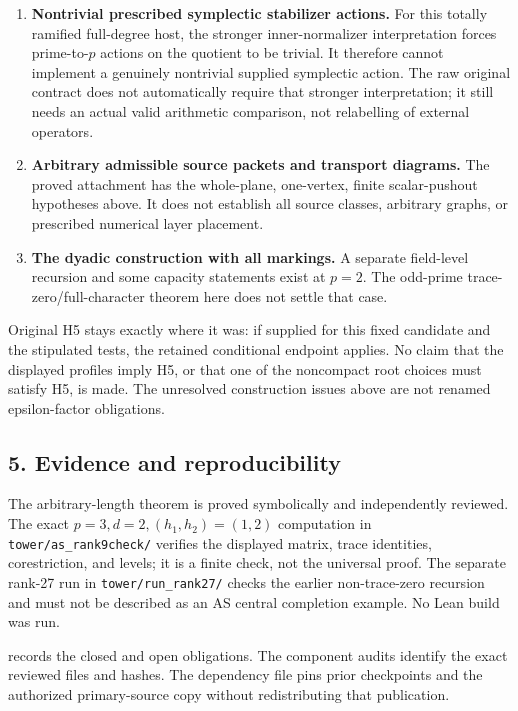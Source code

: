 \begin{enumerate}
\def\labelenumi{\arabic{enumi}.}
\tightlist
\item
  \textbf{Nontrivial prescribed symplectic stabilizer actions.} For this
  totally ramified full-degree host, the stronger inner-normalizer
  interpretation forces prime-to-\(p\) actions on the quotient to be
  trivial. It therefore cannot implement a genuinely nontrivial supplied
  symplectic action. The raw original contract does not automatically
  require that stronger interpretation; it still needs an actual valid
  arithmetic comparison, not relabelling of external operators.
\item
  \textbf{Arbitrary admissible source packets and transport diagrams.}
  The proved attachment has the whole-plane, one-vertex, finite
  scalar-pushout hypotheses above. It does not establish all source
  classes, arbitrary graphs, or prescribed numerical layer placement.
\item
  \textbf{The dyadic construction with all markings.} A separate
  field-level recursion and some capacity statements exist at \(p=2\).
  The odd-prime trace-zero/full-character theorem here does not settle
  that case.
\end{enumerate}

Original H5 stays exactly where it was: if supplied for this fixed
candidate and the stipulated tests, the retained conditional endpoint
applies. No claim that the displayed profiles imply H5, or that one of
the noncompact root choices must satisfy H5, is made. The unresolved
construction issues above are not renamed epsilon-factor obligations.

\hypertarget{odd_synthesis-evidence-and-reproducibility}{%
\subsection{5. Evidence and
reproducibility}\label{odd_synthesis-evidence-and-reproducibility}}

The arbitrary-length theorem is proved symbolically and independently
reviewed. The exact \(p=3,d=2,(h_1,h_2)=(1,2)\) computation in
\texttt{tower/as\_rank9check/} verifies the displayed matrix, trace
identities, corestriction, and levels; it is a finite check, not the
universal proof. The separate rank-27 run in \texttt{tower/run\_rank27/}
checks the earlier non-trace-zero recursion and must not be described as
an AS central completion example. No Lean build was run.

 records the closed and open obligations. The
component audits identify the exact reviewed files and hashes. The
dependency file pins prior checkpoints and the authorized primary-source
copy without redistributing that publication.
